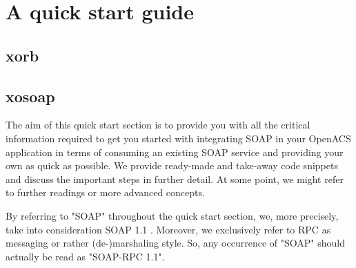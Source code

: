 \section{A quick start guide}\label{sec:quickstart}
  \subsection{xorb}\label{sec:quickstart:xorb}
  \subsection{xosoap}\label{sec:quickstart:xosoap}
  The aim of this quick start section is to provide you with all the
  critical information required to get you started with integrating SOAP
  in your OpenACS application in terms of consuming an existing SOAP
  service and providing your own as quick as possible. We provide
  ready-made and take-away code snippets and discuss the important steps
  in further detail. At some point, we might refer to further readings
  or more advanced concepts.
  \begin{hints}
  \item By referring to "SOAP" throughout the quick start section, we,
    more precisely, take into consideration SOAP 1.1
    \cite{w3c:2000}. Moreover, we exclusively refer to RPC as messaging or
    rather (de-)marshaling style. So, any occurrence of "SOAP" should
    actually be read as "SOAP-RPC 1.1".
  \end{hints}

